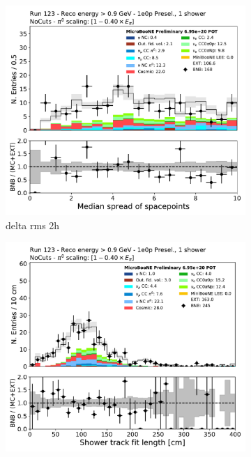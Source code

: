 \begin{figure}[H]
    \centering
    \begin{subfigure}{0.3\textwidth}
    \includegraphics[width=1.0\textwidth]{1e0p/High_E_Sideband/DeltaRMS2h.pdf}
    \caption{delta rms 2h}
    \end{subfigure}
    \begin{subfigure}{0.3\textwidth}
    \includegraphics[width=1.0\textwidth]{1e0p/High_E_Sideband/shr_trk_len.pdf}

\end{subfigure}
\end{figure}
